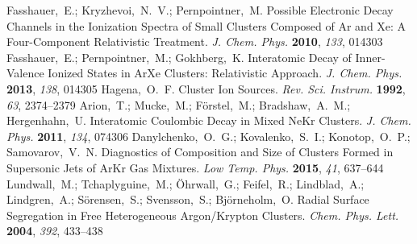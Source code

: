 \documentclass[journal=jpccck,manuscript=article]{achemso}
\begin{document}
\begin{mcitethebibliography}{73}
\EndOfBibitem
{}
Fasshauer,~E.; Kryzhevoi,~N.~V.; Pernpointner,~M. Possible Electronic Decay
  Channels in the Ionization Spectra of Small Clusters Composed of Ar and Xe: A
  Four-Component Relativistic Treatment. \emph{J. Chem. Phys.} \textbf{2010},
  \emph{133}, 014303\relax
\mciteBstWouldAddEndPuncttrue
\mciteSetBstMidEndSepPunct{\mcitedefaultmidpunct}
{\mcitedefaultendpunct}{\mcitedefaultseppunct}\relax
\EndOfBibitem
{}
Fasshauer,~E.; Pernpointner,~M.; Gokhberg,~K. Interatomic Decay of
  Inner-Valence Ionized States in ArXe Clusters: Relativistic Approach.
  \emph{J. Chem. Phys.} \textbf{2013}, \emph{138}, 014305\relax
\mciteBstWouldAddEndPuncttrue
\mciteSetBstMidEndSepPunct{\mcitedefaultmidpunct}
{\mcitedefaultendpunct}{\mcitedefaultseppunct}\relax
\EndOfBibitem
{}
Hagena,~O.~F. {Cluster Ion Sources}. \emph{Rev. Sci. Instrum.} \textbf{1992},
  \emph{63}, 2374--2379\relax
\mciteBstWouldAddEndPuncttrue
\mciteSetBstMidEndSepPunct{\mcitedefaultmidpunct}
{\mcitedefaultendpunct}{\mcitedefaultseppunct}\relax
\EndOfBibitem
{}
Arion,~T.; Mucke,~M.; F\"orstel,~M.; Bradshaw,~A.~M.; Hergenhahn,~U.
  Interatomic Coulombic Decay in Mixed NeKr Clusters. \emph{J. Chem. Phys.}
  \textbf{2011}, \emph{134}, 074306\relax
\mciteBstWouldAddEndPuncttrue
\mciteSetBstMidEndSepPunct{\mcitedefaultmidpunct}
{\mcitedefaultendpunct}{\mcitedefaultseppunct}\relax
\EndOfBibitem
{}
Danylchenko,~O.~G.; Kovalenko,~S.~I.; Konotop,~O.~P.; Samovarov,~V.~N.
  Diagnostics of Composition and Size of Clusters Formed in Supersonic Jets of
  ArKr Gas Mixtures. \emph{Low Temp. Phys.} \textbf{2015}, \emph{41},
  637--644\relax
\mciteBstWouldAddEndPuncttrue
\mciteSetBstMidEndSepPunct{\mcitedefaultmidpunct}
{\mcitedefaultendpunct}{\mcitedefaultseppunct}\relax
\EndOfBibitem
{}
Lundwall,~M.; Tchaplyguine,~M.; \"Ohrwall,~G.; Feifel,~R.; Lindblad,~A.;
  Lindgren,~A.; S\"orensen,~S.; Svensson,~S.; Bj\"orneholm,~O. Radial Surface
  Segregation in Free Heterogeneous Argon/Krypton Clusters. \emph{Chem. Phys.
  Lett.} \textbf{2004}, \emph{392}, 433--438\relax

\end{mcitethebibliography}
\end{document}

